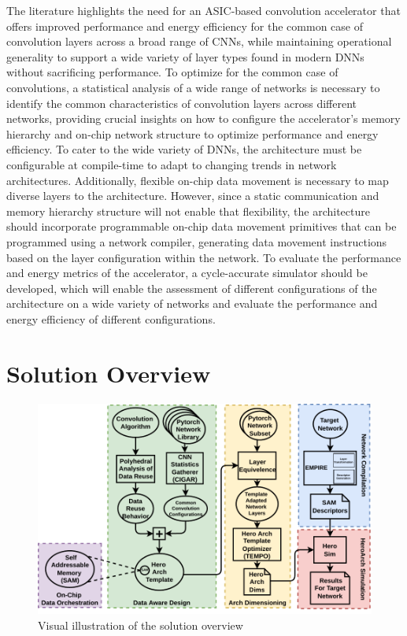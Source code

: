 The literature highlights the need for an ASIC-based convolution accelerator
that offers improved performance and energy efficiency for the common case of
convolution layers across a broad range of CNNs, while maintaining operational
generality to support a wide variety of layer types found in modern DNNs without
sacrificing performance. To optimize for the common case of convolutions, a
statistical analysis of a wide range of networks is necessary to identify the
common characteristics of convolution layers across different networks,
providing crucial insights on how to configure the accelerator's memory
hierarchy and on-chip network structure to optimize performance and energy
efficiency. To cater to the wide variety of DNNs, the architecture must be
configurable at compile-time to adapt to changing trends in network
architectures. Additionally, flexible on-chip data movement is necessary to map
diverse layers to the architecture. However, since a static communication and
memory hierarchy structure will not enable that flexibility, the architecture
should incorporate programmable on-chip data movement primitives that can be
programmed using a network compiler, generating data movement instructions based
on the layer configuration within the network. To evaluate the performance and
energy metrics of the accelerator, a cycle-accurate simulator should be
developed, which will enable the assessment of different configurations of the
architecture on a wide variety of networks and evaluate the performance and
energy efficiency of different configurations.

\section{Solution Overview}
\label{chap:intro:solution_overview}

\begin{figure}[!ht]
  \centering
  \includegraphics[scale=1]{fig/intro.pdf}
  \caption{Visual illustration of the solution overview}
  \label{fig:intro}
\end{figure}


